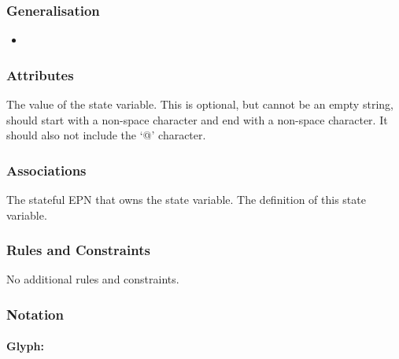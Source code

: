 \subsubsection{Generalisation}

\begin{itemize}
\item {}
\end{itemize}

\subsubsection{Attributes}

\begin{attributes}
   The value of the state variable. This is
  optional, but cannot be an empty string, should start with a
  non-space character and end with a non-space character. It should
  also not include the `@' character.
\end{attributes}

\subsubsection{Associations}

\begin{attributes}
    The stateful EPN that owns
  the state variable.
   The definition of
  this state variable.
\end{attributes}

\subsubsection{Rules and Constraints}

No additional rules and constraints.

\subsubsection{Notation}


\paragraph{Glyph: }
\label{sec:stateVariable}


